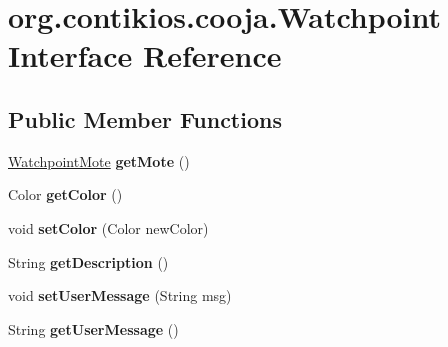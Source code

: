\hypertarget{interfaceorg_1_1contikios_1_1cooja_1_1Watchpoint}{\section{org.\-contikios.\-cooja.\-Watchpoint Interface Reference}
\label{interfaceorg_1_1contikios_1_1cooja_1_1Watchpoint}
}
\subsection*{Public Member Functions}
\begin{DoxyCompactItemize}
\item 
\hypertarget{interfaceorg_1_1contikios_1_1cooja_1_1Watchpoint_a3c68dab7c90c85695e85bab407067e7f}{\hyperlink{interfaceorg_1_1contikios_1_1cooja_1_1WatchpointMote}{Watchpoint\-Mote} {\bfseries get\-Mote} ()}\label{interfaceorg_1_1contikios_1_1cooja_1_1Watchpoint_a3c68dab7c90c85695e85bab407067e7f}

\item 
\hypertarget{interfaceorg_1_1contikios_1_1cooja_1_1Watchpoint_a2ee61d65c4dc1ea45f3982a5b858c27e}{Color {\bfseries get\-Color} ()}\label{interfaceorg_1_1contikios_1_1cooja_1_1Watchpoint_a2ee61d65c4dc1ea45f3982a5b858c27e}

\item 
\hypertarget{interfaceorg_1_1contikios_1_1cooja_1_1Watchpoint_addff38d640bdc980d2f15067180a6719}{void {\bfseries set\-Color} (Color new\-Color)}\label{interfaceorg_1_1contikios_1_1cooja_1_1Watchpoint_addff38d640bdc980d2f15067180a6719}

\item 
\hypertarget{interfaceorg_1_1contikios_1_1cooja_1_1Watchpoint_a1c5ec940d4fd286228b342b900489c2f}{String {\bfseries get\-Description} ()}\label{interfaceorg_1_1contikios_1_1cooja_1_1Watchpoint_a1c5ec940d4fd286228b342b900489c2f}

\item 
\hypertarget{interfaceorg_1_1contikios_1_1cooja_1_1Watchpoint_ae0df94ae24cd0c0fe3596ad8dde51750}{void {\bfseries set\-User\-Message} (String msg)}\label{interfaceorg_1_1contikios_1_1cooja_1_1Watchpoint_ae0df94ae24cd0c0fe3596ad8dde51750}

\item 
\hypertarget{interfaceorg_1_1contikios_1_1cooja_1_1Watchpoint_a412c90524ecb0a39f040dc59724bddb8}{String {\bfseries get\-User\-Message} ()}\label{interfaceorg_1_1contikios_1_1cooja_1_1Watchpoint_a412c90524ecb0a39f040dc59724bddb8}


\end{DoxyCompactItemize}
